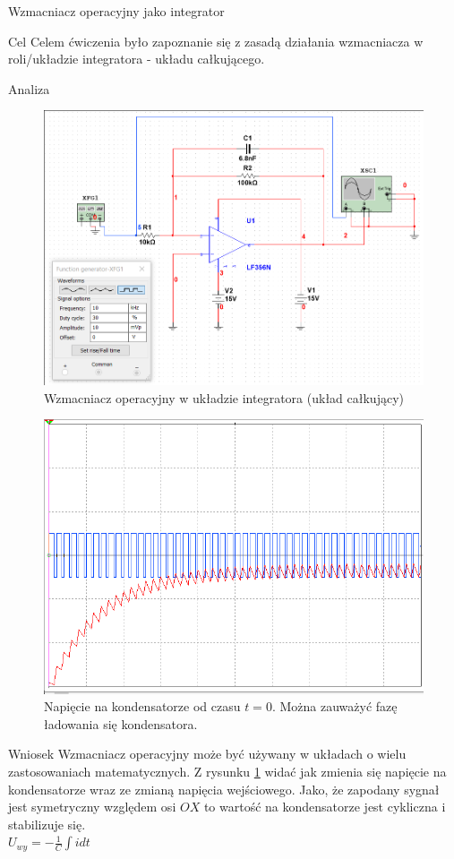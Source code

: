 \documentclass[a4paper]{scrartcl}
\begin{document}
	\begin{section}{Wzmacniacz operacyjny jako integrator}
		\begin{subsection}{Cel}
			Celem ćwiczenia było zapoznanie się z zasadą działania wzmacniacza w roli/układzie integratora - układu całkującego.
		\end{subsection}
		\begin{subsection}{Analiza}
				\begin{figure}[ht]
				\begin{center}
					\includegraphics[width=0.5\linewidth]{07-circuit}
					\caption{Wzmacniacz operacyjny w układzie integratora (układ całkujący)}
				\end{center}
				\end{figure}
				\begin{figure}[ht]
				\begin{center}
					\includegraphics[width=0.5\linewidth]{07-osc}
					\caption{Napięcie na kondensatorze od czasu $ t=0 $. Można zauważyć fazę ładowania się kondensatora.}
					\label{fig:circuit-7-osc}
				\end{center}
				\end{figure}
		\end{subsection}
		\begin{subsection}{Wniosek}
			Wzmacniacz operacyjny może być używany w układach o wielu zastosowaniach matematycznych. Z rysunku \ref{fig:circuit-7-osc} widać jak zmienia się napięcie na kondensatorze wraz ze zmianą napięcia wejściowego. Jako, że zapodany sygnał jest symetryczny względem osi $ OX $ to wartość na kondensatorze jest cykliczna i stabilizuje się. \\
			$ U_{wy} = -\frac{1}{C}\int{i dt}$
		\end{subsection}
	\end{section}
\end{document}
